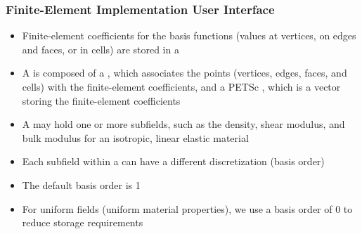 \documentclass[aspectratio=169]{beamer}
\begin{document}
\begin{frame}
  \frametitle{Finite-Element Implementation User Interface}
  \summary{}

  \begin{itemize}
    \pause
    \begin{itemize}
    \item Finite-element coefficients for the basis functions (values at vertices, on edges and faces, or in cells) are stored in a 
    \item A  is composed of a , which associates the points (vertices, edges, faces, and cells) with the finite-element coefficients, and a PETSc , which is a vector storing the finite-element coefficients
    \item A  may hold one or more subfields, such as the density, shear modulus, and bulk modulus for an isotropic, linear elastic material
    \end{itemize}\pause
    \begin{itemize}
    \item Each subfield within a  can have a different discretization (basis order)
    \item The default basis order is 1
    \item For uniform fields (uniform material properties), we use a basis order of 0 to reduce storage requirements
    \end{itemize}
  \end{itemize}

\end{frame}
\end{document}
